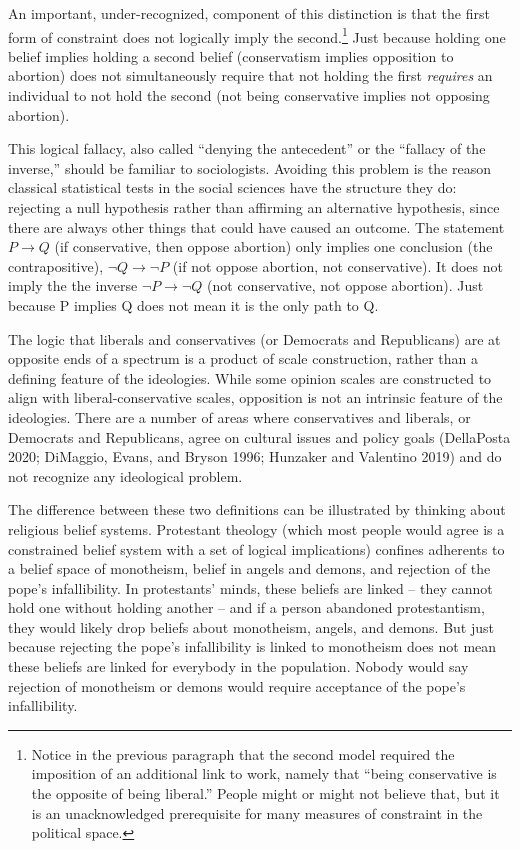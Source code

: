 \documentclass[12pt,]{article}
\begin{document}
An important, under-recognized, component of this distinction is that the first form of constraint does not logically imply the second.\footnote{Notice in the previous paragraph that the second model required the imposition of an additional link to work, namely that ``being conservative is the opposite of being liberal.'' People might or might not believe that, but it is an unacknowledged prerequisite for many measures of constraint in the political space.} Just because holding one belief implies holding a second belief (conservatism implies opposition to abortion) does not simultaneously require that not holding the first \emph{requires} an individual to not hold the second (not being conservative implies not opposing abortion).

This logical fallacy, also called ``denying the antecedent'' or the ``fallacy of the inverse,'' should be familiar to sociologists. Avoiding this problem is the reason classical statistical tests in the social sciences have the structure they do: rejecting a null hypothesis rather than affirming an alternative hypothesis, since there are always other things that could have caused an outcome. The statement \(P \to Q\) (if conservative, then oppose abortion) only implies one conclusion (the contrapositive), \(\lnot Q \to \lnot P\) (if not oppose abortion, not conservative). It does not imply the the inverse \(\lnot P \to \lnot Q\) (not conservative, not oppose abortion). Just because P implies Q does not mean it is the only path to Q.

The logic that liberals and conservatives (or Democrats and Republicans) are at opposite ends of a spectrum is a product of scale construction, rather than a defining feature of the ideologies. While some opinion scales are constructed to align with liberal-conservative scales, opposition is not an intrinsic feature of the ideologies. There are a number of areas where conservatives and liberals, or Democrats and Republicans, agree on cultural issues and policy goals (DellaPosta 2020; DiMaggio, Evans, and Bryson 1996; Hunzaker and Valentino 2019) and do not recognize any ideological problem.

The difference between these two definitions can be illustrated by thinking about religious belief systems. Protestant theology (which most people would agree is a constrained belief system with a set of logical implications) confines adherents to a belief space of monotheism, belief in angels and demons, and rejection of the pope's infallibility. In protestants' minds, these beliefs are linked -- they cannot hold one without holding another -- and if a person abandoned protestantism, they would likely drop beliefs about monotheism, angels, and demons. But just because rejecting the pope's infallibility is linked to monotheism does not mean these beliefs are linked for everybody in the population. Nobody would say rejection of monotheism or demons would require acceptance of the pope's infallibility.
\end{document}
